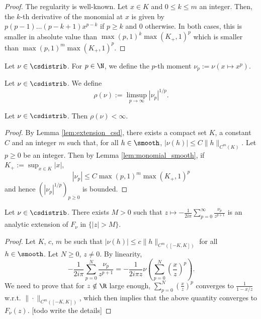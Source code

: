 \begin{proof}
  The regularity is well-known.
  Let $x \in K$ and $0 \leq k \leq m$ an integer.
  Then,
  the $k$-th derivative of the monomial at $x$ is given by
  $p(p-1) \ldots (p-k+1) x^{p-k}$ if $p\geq k$ and $0$ otherwise.
  In both cases,
  this is smaller in absolute value
  than $\max (p,1)^k \max(K_+,1)^p$ which is smaller than $\max(p,1)^m \max(K_+,1)^p$.
\end{proof}

\begin{definition}
  \label{def:moment}
  Let $\nu \in \csdistrib$.
  For $p \in \N$, we define the $p$-th moment $\nu_p := \nu(x \mapsto x^p)$.
\end{definition}

\begin{definition}
  \label{def:radius_csd}
  Let $\nu \in \csdistrib$.
  We define $$\rho(\nu) := \limsup_{p \to \infty} |\nu_p|^{1/p} .$$
\end{definition}

\begin{lemma}
  \label{lem:radius_finite}
  Let $\nu \in \csdistrib$.
  Then $\rho(\nu) < \infty$.
\end{lemma}

\begin{proof}
  By Lemma \ref{lem:extension_csd}, there exists a compact set $K$,
  a constant $C$ and an integer $m$
  such that, for all $h \in \smooth$,
  $|\nu(h)| \leq C \|h\|_{C^m(K)}$.
Let $p \geq 0$ be an integer.
Then by Lemma \ref{lem:monomial_smooth}, if $K_+ := \sup_{x \in K} |x|$,
$$|\nu_p| \leq C \max(p,1)^m \max (K_+,1)^p$$
and hence $(|\nu_p|^{1/p})_{p \geq 0}$ is bounded.
\end{proof}

\begin{proposition}
  \label{prop:Stieltjes_expansion}
  \notready
  Let $\nu \in \csdistrib$.
  There exists $M > 0$ such that $z \mapsto -\frac{1}{2 i \pi} \sum_{p=0}^\infty \frac{\nu_p}{z^{p+1}}$
  is an analytic extension of $F_\nu$ in $\{|z| > M\}$.
\end{proposition}

\begin{proof}
  Let $K$, $c$, $m$ be such that $|\nu(h)| \leq c \|h\|_{C^m([-K,K])}$ for all $h \in \smooth$.
  Let $N \geq 0$, $z \neq 0$. By linearity,
  \begin{equation*}
    -\frac{1}{2i \pi}
    \sum_{p=0}^N \frac{\nu_p}{z^{p+1}}
    = -\frac{1}{2 i \pi z} \nu \left( \sum_{p=0}^N \left(\frac{x}{z}\right)^p \right).
  \end{equation*}
  We need to prove that for $z \notin \R$
  large enough, $\sum_{p=0}^N \left(\frac{x}{z}\right)^p$
  converges to $\frac{1}{1-x/z}$ w.r.t. $\|\cdot\|_{C^m([-K,K])}$,
  which then implies that the above quantity converges to $F_\nu(z)$.
    [todo write the details]
\end{proof}

